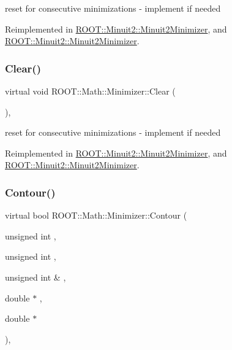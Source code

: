 reset for consecutive minimizations -\/ implement if needed 



Reimplemented in \mbox{\hyperlink{classROOT_1_1Minuit2_1_1Minuit2Minimizer_a11e6ce9a4285080548f9855b78ca83b4}{R\+O\+O\+T\+::\+Minuit2\+::\+Minuit2\+Minimizer}}, and \mbox{\hyperlink{classROOT_1_1Minuit2_1_1Minuit2Minimizer_a11e6ce9a4285080548f9855b78ca83b4}{R\+O\+O\+T\+::\+Minuit2\+::\+Minuit2\+Minimizer}}.

\mbox{\label{classROOT_1_1Math_1_1Minimizer_ad7308846baecf68fb0dbc2d5e4caa178}} 
\subsubsection{\texorpdfstring{Clear()}{Clear()}\hspace{0.1cm}{\footnotesize\ttfamily [2/2]}}
{\footnotesize\ttfamily virtual void R\+O\+O\+T\+::\+Math\+::\+Minimizer\+::\+Clear (\begin{DoxyParamCaption}{ }\end{DoxyParamCaption})\hspace{0.3cm}{\ttfamily [inline]}, {\ttfamily [virtual]}}



reset for consecutive minimizations -\/ implement if needed 



Reimplemented in \mbox{\hyperlink{classROOT_1_1Minuit2_1_1Minuit2Minimizer_a11e6ce9a4285080548f9855b78ca83b4}{R\+O\+O\+T\+::\+Minuit2\+::\+Minuit2\+Minimizer}}, and \mbox{\hyperlink{classROOT_1_1Minuit2_1_1Minuit2Minimizer_a11e6ce9a4285080548f9855b78ca83b4}{R\+O\+O\+T\+::\+Minuit2\+::\+Minuit2\+Minimizer}}.

\mbox{\label{classROOT_1_1Math_1_1Minimizer_aeb8855190ff2e37911c38ed839f2043c}} 
\subsubsection{\texorpdfstring{Contour()}{Contour()}\hspace{0.1cm}{\footnotesize\ttfamily [1/2]}}
{\footnotesize\ttfamily virtual bool R\+O\+O\+T\+::\+Math\+::\+Minimizer\+::\+Contour (\begin{DoxyParamCaption}\item[{unsigned int}]{,  }\item[{unsigned int}]{,  }\item[{unsigned int \&}]{,  }\item[{double $\ast$}]{,  }\item[{double $\ast$}]{ }\end{DoxyParamCaption})\hspace{0.3cm}{\ttfamily [inline]}, {\ttfamily [virtual]}}


